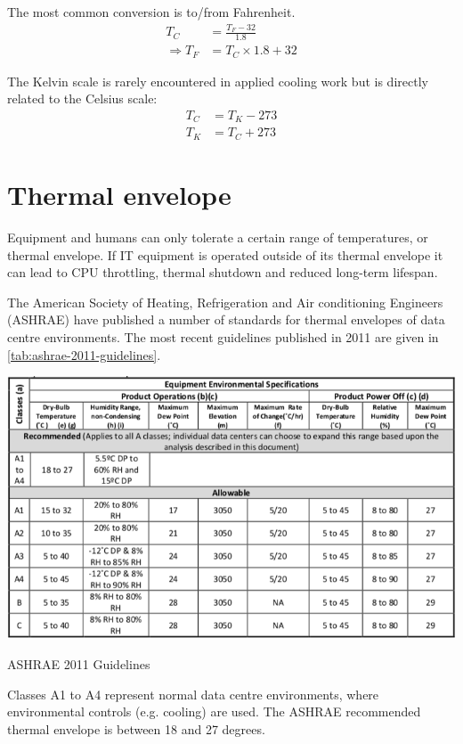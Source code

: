 \documentclass{pgnotes}
\begin{document}
The most common conversion is to/from Fahrenheit.
\begin{align}
  T_C & = \frac{T_F-32}{1.8} \label{eq:f-to-c} \\
  \Rightarrow  T_F & = T_C \times 1.8 + 32 \label{eq:c-to-f}
\end{align}

The Kelvin scale is rarely encountered in applied cooling work but is directly related to the Celsius scale:
\begin{align}
  T_C & = T_K - 273 \label{eq:k-to-c} \\
  T_K & = T_C + 273 \label{eq:c-to-k} 
\end{align}

\section{Thermal envelope}
\label{sec:thermal-envelope}

Equipment and humans can only tolerate a certain range of temperatures, or thermal envelope.
If IT equipment is operated outside of its thermal envelope it can lead to CPU throttling, thermal shutdown and reduced long-term lifespan.

The American Society of Heating, Refrigeration and Air conditioning Engineers (ASHRAE) have published a number of standards for thermal envelopes of data centre environments.
The most recent guidelines published in 2011 are given in \autoref{tab:ashrae-2011-guidelines}.
\begin{table}[htbp]
  \centering
  \includegraphics[width=1.0\linewidth]{ashrae_2011_guidelines_celsius}
  \caption{ASHRAE 2011 Guidelines}
  \label{tab:ashrae-2011-guidelines}
\end{table}
Classes A1 to A4 represent normal data centre environments, where environmental controls (e.g. cooling) are used.
The ASHRAE recommended thermal envelope is between 18 and 27 degrees.
\end{document}
